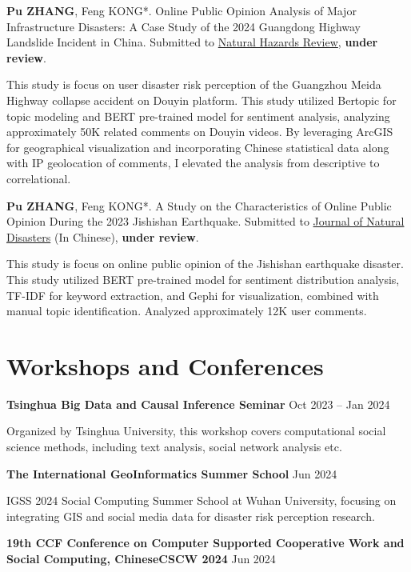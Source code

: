 \documentclass[letterpaper, 11pt]{article}
\begin{document}
\vspace{0.5em}
\textbf{Pu ZHANG}, Feng KONG*. Online Public Opinion Analysis of Major Infrastructure Disasters: A Case Study of the 2024 Guangdong Highway Landslide Incident in China. Submitted to \href{https://ascelibrary.org/journal/nhrefo}{Natural Hazards Review}, \textbf{under review}.

This study is focus on user disaster risk perception of the Guangzhou Meida Highway collapse accident on Douyin platform. This study utilized Bertopic for topic modeling and BERT pre-trained model for sentiment analysis, analyzing approximately 50K related comments on Douyin videos. By leveraging ArcGIS for geographical visualization and incorporating Chinese statistical data along with IP geolocation of comments, I elevated the analysis from descriptive to correlational.

\vspace{0.5em}
\textbf{Pu ZHANG}, Feng KONG*. A Study on the Characteristics of Online Public Opinion During the 2023 Jishishan Earthquake. Submitted to {\href{https://zrzh.paperonce.org/#/}{Journal of Natural Disasters}} (In Chinese), \textbf{under review}.

This study is focus on online public opinion of the Jishishan earthquake disaster. This study utilized BERT pre-trained model for sentiment distribution analysis, TF-IDF for keyword extraction, and Gephi for visualization, combined with manual topic identification. Analyzed approximately 12K user comments.

\section{Workshops and Conferences}
\textbf{Tsinghua Big Data and Causal Inference Seminar} \hfill Oct 2023 -- Jan 2024

Organized by Tsinghua University, this workshop covers computational social science methods, including text analysis, social network analysis etc.

\vspace{0.5em}
\textbf{The International GeoInformatics Summer School} \hfill Jun 2024

IGSS 2024 Social Computing Summer School at Wuhan University, focusing on integrating GIS and social media data for disaster risk perception research.

\vspace{0.5em}
\textbf{19th CCF Conference on Computer Supported Cooperative Work and Social Computing, ChineseCSCW 2024} \hfill Jun 2024
\end{document}
